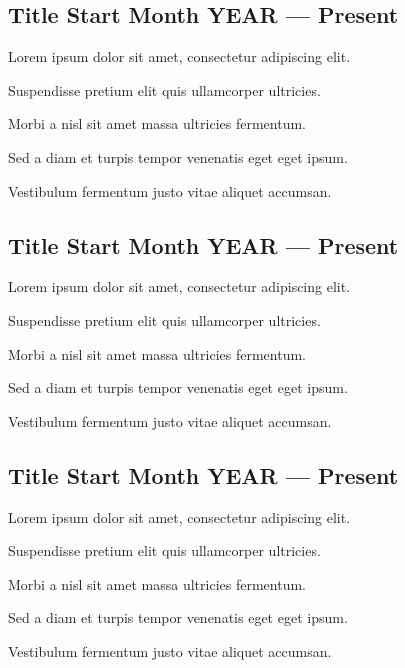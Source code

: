 \documentclass[a4paper,12pt]{article}
\begin{document}


\subsection{{Title \hfill Start Month YEAR --- Present}}
\begin{zitemize}
\item Lorem ipsum dolor sit amet, consectetur adipiscing elit.
\item Suspendisse pretium elit quis ullamcorper ultricies.
\item Morbi a nisl sit amet massa ultricies fermentum.
\item Sed a diam et turpis tempor venenatis eget eget ipsum.
\item Vestibulum fermentum justo vitae aliquet accumsan.
\end{zitemize}


\subsection{{Title \hfill Start Month YEAR --- Present}}
\begin{zitemize}
\item Lorem ipsum dolor sit amet, consectetur adipiscing elit.
\item Suspendisse pretium elit quis ullamcorper ultricies.
\item Morbi a nisl sit amet massa ultricies fermentum.
\item Sed a diam et turpis tempor venenatis eget eget ipsum.
\item Vestibulum fermentum justo vitae aliquet accumsan.
\end{zitemize}



\subsection{{Title \hfill Start Month YEAR --- Present}}
\begin{zitemize}
\item Lorem ipsum dolor sit amet, consectetur adipiscing elit.
\item Suspendisse pretium elit quis ullamcorper ultricies.
\item Morbi a nisl sit amet massa ultricies fermentum.
\item Sed a diam et turpis tempor venenatis eget eget ipsum.
\item Vestibulum fermentum justo vitae aliquet accumsan.
\end{zitemize}
\end{document}
